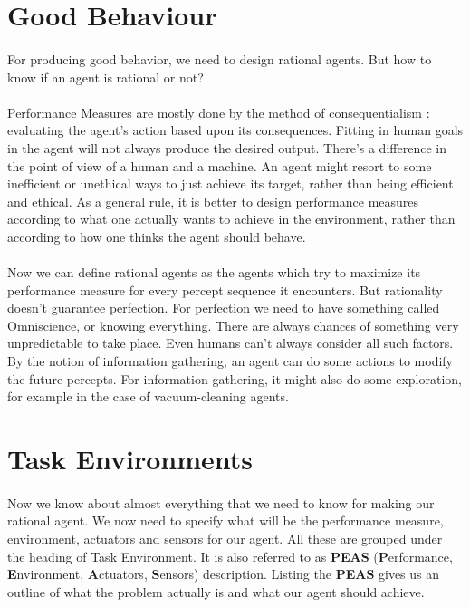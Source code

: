 \documentclass{article}
\begin{document}
  \vspace{25pt}
\section*{Good Behaviour}
\paragraph{}
For producing good behavior, we need to design rational agents. But how to know if an agent is rational or not?

\paragraph{}
  Performance Measures are mostly done by the method of consequentialism : evaluating the agent’s action based upon its consequences. 
  Fitting in human goals in the agent will not always produce the desired output. 
  There’s a difference in the point of view of a human and a machine. 
  An agent might resort to some inefficient or unethical ways to just achieve its target, rather than being efficient and ethical. 
  As a general rule, it is better to design performance measures according to what one actually wants to achieve in the environment, rather than according to how one thinks the agent should behave.

\paragraph{}
  Now we can define rational agents as the agents which try to maximize its performance measure for every percept sequence it encounters.
  But rationality doesn't guarantee perfection. 
  For perfection we need to have something called Omniscience, or knowing everything. 
  There are always chances of something very unpredictable to take place. 
  Even humans can’t always consider all such factors. 
  By the notion of information gathering, an agent can do some actions to modify the future percepts. 
  For information gathering, it might also do some exploration, for example in the case of vacuum-cleaning agents.  

  \vspace{25pt}
\section*{Task Environments}
\paragraph{}
  Now we know about almost everything that we need to know for making our rational agent. 
  We now need to specify what will be the performance measure, environment, actuators and sensors for our agent. 
  All these are grouped under the heading of Task Environment. 
  It is also referred to as \textbf{PEAS} (\textbf{P}erformance, \textbf{E}nvironment, \textbf{A}ctuators, \textbf{S}ensors) description. 
  Listing the \textbf{PEAS} gives us an outline of what the problem actually is and what our agent should achieve.
\end{document}
